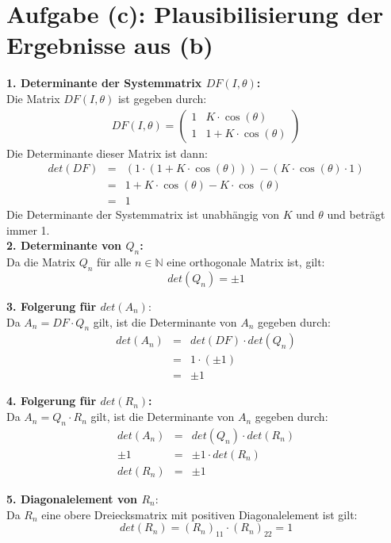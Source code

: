 \documentclass[paper=a4, 
                DIV=12]{scrartcl}
\begin{document}
\section{Aufgabe (c): Plausibilisierung der Ergebnisse aus (b)}
\textbf{1. Determinante der Systemmatrix $DF(I, \theta)$:} \\
Die Matrix $DF(I, \theta)$ ist gegeben durch:
\begin{gather*}
    DF(I, \theta) = \begin{pmatrix}
        1 & K \cdot \cos(\theta) \\
        1 & 1 + K \cdot \cos(\theta)
    \end{pmatrix}
\end{gather*}
Die Determinante dieser Matrix ist dann:
\begin{eqnarray*}
    det(DF) &=& (1 \cdot (1 + K \cdot \cos(\theta))) - (K \cdot \cos(\theta) \cdot 1) \\
    &=& 1 + K \cdot \cos(\theta) - K \cdot \cos(\theta) \\
    &=& 1
\end{eqnarray*}
Die Determinante der Systemmatrix ist unabhängig von $K$ und $\theta$ und beträgt immer 1. \\

\noindent\textbf{2. Determinante von $Q_n$:} \\
Da die Matrix $Q_n$ für alle $n \in \mathbb{N}$ eine orthogonale Matrix ist, gilt:
$$ det(Q_n) = \pm 1 $$

\noindent\textbf{3. Folgerung für $det(A_n)$}: \\
Da $A_n = DF \cdot Q_n$ gilt, ist die Determinante von $A_n$ gegeben durch:
\begin{eqnarray*}
    det(A_n) &=& det(DF) \cdot det(Q_n) \\
    &=& 1 \cdot (\pm 1) \\
    &=& \pm 1  
\end{eqnarray*}

\noindent\textbf{4. Folgerung für $det(R_n)$:} \\
Da $A_n = Q_n \cdot R_n$ gilt, ist die Determinante von $A_n$ gegeben durch:
\begin{eqnarray*}
    det(A_n) &=& det(Q_n) \cdot det(R_n) \\
    \pm 1 &=& \pm 1 \cdot det(R_n) \\
    det(R_n) &=& \pm 1
\end{eqnarray*}

\noindent\textbf{5. Diagonalelement von $R_n$}: \\
Da $R_n$ eine obere Dreiecksmatrix mit positiven Diagonalelement ist gilt:
$$ det(R_n) = (R_n)_{11} \cdot (R_n)_{22} = 1$$
\end{document}
